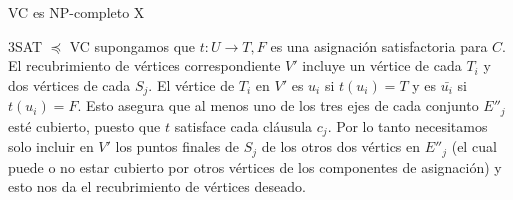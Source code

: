 \documentclass[10pt, mathserif, profesionalfont]{beamer}
\begin{document}
\begin{frame}{VC es NP-completo X}

\begin{block}{3SAT $\preceq$ VC}    
supongamos que $t: U \rightarrow {T,F}$ es una asignación satisfactoria para $C$. El recubrimiento de vértices correspondiente $V'$ incluye un vértice de cada $T_i$ y dos vértices de cada $S_j$. El vértice de $T_i$ en $V'$ es $u_i$ si $t(u_i)=T$ y es $\bar{u_i}$ si $t(u_i)=F$. Esto asegura que al menos uno de los tres ejes de cada conjunto $E''_j$ esté cubierto, puesto que $t$ satisface cada cláusula $c_j$. Por lo tanto necesitamos solo incluir en $V'$ los puntos finales de $S_j$ de los otros dos vértics en $E''_j$ (el cual puede o no estar cubierto por otros vértices de los componentes de asignación) y esto nos da el recubrimiento de vértices deseado.
\end{block}

\end{frame}
\end{document}
